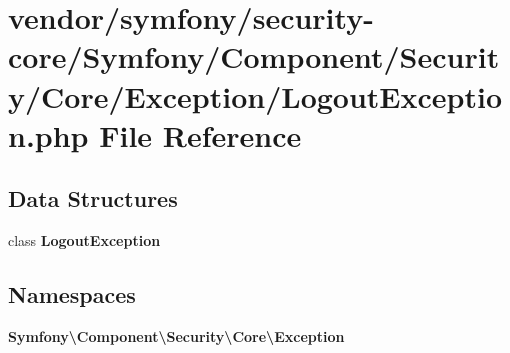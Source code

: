 \section{vendor/symfony/security-\/core/\+Symfony/\+Component/\+Security/\+Core/\+Exception/\+Logout\+Exception.php File Reference}
\label{_logout_exception_8php}
\subsection*{Data Structures}
\begin{DoxyCompactItemize}
\item 
class {\bf Logout\+Exception}
\end{DoxyCompactItemize}
\subsection*{Namespaces}
\begin{DoxyCompactItemize}
\item 
 {\bf Symfony\textbackslash{}\+Component\textbackslash{}\+Security\textbackslash{}\+Core\textbackslash{}\+Exception}
\end{DoxyCompactItemize}
